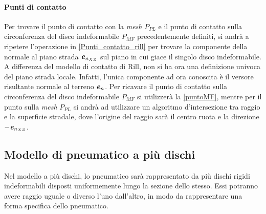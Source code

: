 \paragraph{Punti di contatto}
Per trovare il punto di contatto con la \textit{mesh} $P_{PL}$ e il punto di contatto sulla circonferenza del disco indeformabile $P_{MF}$ precedentemente definiti, si andrà a ripetere l'operazione in \ref{Punti_contatto_rill} per trovare la componente della normale al piano strada $\textbf{\textit{e}}_{n_{XZ}}$ sul piano in cui giace il singolo disco indeformabile. A differenza del modello di contatto di Rill, non si ha ora una definizione univoca del piano strada locale. Infatti, l'unica componente ad ora conoscita è il versore risultante normale al terreno $\textbf{\textit{e}}_n$. Per ricavare il punto di contatto sulla circonferenza del disco indeformabile $P_{MF}$ si utilizzerà la \eqref{puntoMF}, mentre per il punto sulla \textit{mesh} $P_{PL}$ si andrà ad utilizzare un algoritmo d'intersezione tra raggio e la superficie stradale, dove l'origine del raggio sarà il centro ruota e la direzione $-\textbf{\textit{e}}_{n_{XZ}}$.
%
\subsection{Modello di pneumatico a più dischi}
%
Nel modello a più dischi, lo pneumatico sarà rappresentato da più dischi rigidi indeformabili disposti uniformemente lungo la sezione dello stesso. Essi potranno avere raggio uguale o diverso l'uno dall'altro, in modo da rappresentare una forma specifica dello pneumatico.

